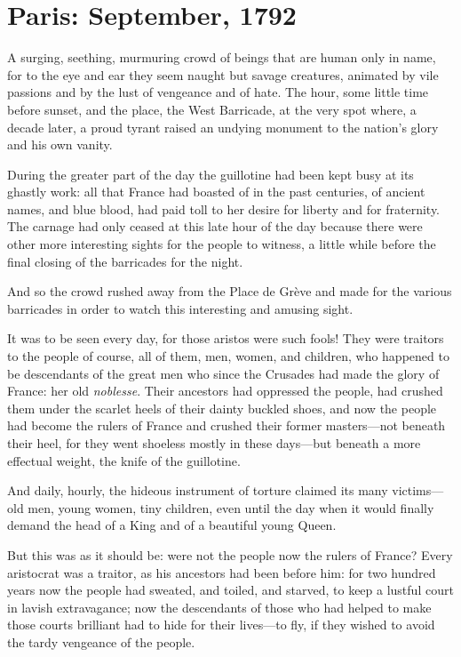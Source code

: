 \chapter{Paris: September, 1792}
\lettrine[lines=4]{A}{} surging, seething, murmuring crowd of beings that are human only in name, for to the eye and ear they seem naught but savage creatures, animated by vile passions and by the lust of vengeance and of hate. The hour, some little time before sunset, and the place, the West Barricade, at the very spot where, a decade later, a proud tyrant raised an undying monument to the nation's glory and his own vanity.

During the greater part of the day the guillotine had been kept busy at its ghastly work: all that France had boasted of in the past centuries, of ancient names, and blue blood, had paid toll to her desire for liberty and for fraternity. The carnage had only ceased at this late hour of the day because there were other more interesting sights for the people to witness, a little while before the final closing of the barricades for the night.

And so the crowd rushed away from the Place de Grève and made for the various barricades in order to watch this interesting and amusing sight.

It was to be seen every day, for those aristos were such fools! They were traitors to the people of course, all of them, men, wo\-men, and children, who happened to be descendants of the great men who since the Crusades had made the glory of France: her old \textit{noblesse}. Their ancestors had oppressed the people, had crushed them under the scarlet heels of their dainty buckled shoes, and now the people had become the rulers of France and crushed their former masters—not beneath their heel, for they went shoeless mostly in these days—but beneath a more effectual weight, the knife of the guillotine.

And daily, hourly, the hideous instrument of torture claimed its many victims—old men, young women, tiny children, even until the day when it would finally demand the head of a King and of a beautiful young Queen.

But this was as it should be: were not the people now the rulers of France? Every aristocrat was a traitor, as his ancestors had been before him: for two hundred years now the people had sweated, and toiled, and starved, to keep a lustful court in lavish extravagance; now the descendants of those who had helped to make those courts brilliant had to hide for their lives—to fly, if they wished to avoid the tardy vengeance of the people.

